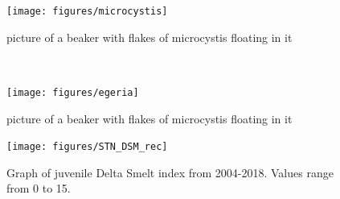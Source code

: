 \documentclass[
]{book}
\begin{document}
\begin{panel-grid}
\begin{columns-nocenter}
\begin{column800}
\begin{figure}
{\centering \texttt{[image: figures/microcystis]} 

}

\caption{picture of a beaker with flakes of microcystis floating in it}\label{fig:unnamed-chunk-86}
\end{figure}

\end{column800}

\begin{column40}

~

\end{column40}

\begin{column800}

\begin{figure}

{\centering \texttt{[image: figures/egeria]} 

}

\caption{picture of a beaker with flakes of microcystis floating in it}\label{fig:unnamed-chunk-87}
\end{figure}

\end{column800}

\end{columns-nocenter}

\begin{columns-nocenter}

\begin{column800}

\begin{expand}

\begin{figure}
\texttt{[image: figures/STN\_DSM\_rec]} \caption{Graph of juvenile Delta Smelt index from 2004-2018. Values range from 0 to 15.}\label{fig:unnamed-chunk-88}
\end{figure}

\end{expand}

\end{column800}

\begin{column40}

~

\end{column40}

\begin{column800}

\begin{expand}


\end{expand}
\end{column800}
\end{columns-nocenter}
\end{panel-grid}
\end{document}
